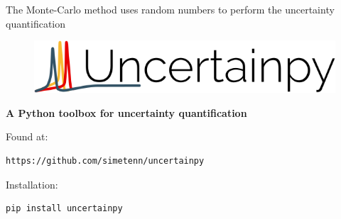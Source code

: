 \documentclass[presentation]{beamer}
\begin{document}
\begin{frame}{The Monte-Carlo method uses random numbers to perform the
              uncertainty quantification}
\begin{figure}
  \end{figure}
\end{frame}



\begin{frame}[fragile]
\vspace{-1cm}
\begin{figure}
\includegraphics[width=1\textwidth]{uncertainpy.png}
\end{figure}

{\LARGE \bf A Python toolbox for uncertainty quantification}

\vspace{1cm}

Found at:

\begin{lstlisting}
https://github.com/simetenn/uncertainpy
\end{lstlisting}


Installation:

\begin{lstlisting}
pip install uncertainpy
\end{lstlisting}

\end{frame}
\end{document}
